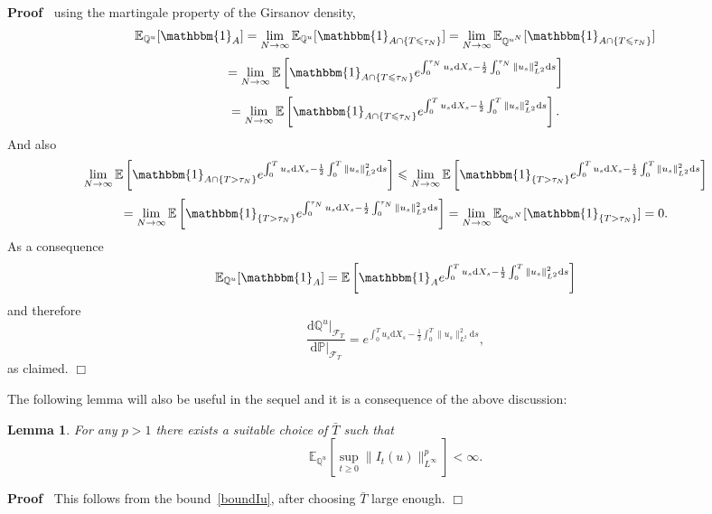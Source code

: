 \documentclass[11pt]{article}
\newcommand{\mathd}{\mathrm{d}}
\newenvironment{proof}{\noindent\textbf{Proof\ }}{\hspace*{\fill}$\Box$\medskip}
\newtheorem{lemma}{Lemma}
\newcommand{\CF}{\mathscr{F}}
\begin{document}
\begin{proof}
  using the martingale property of the Girsanov density,
  \[ \mathbb{E}_{\mathbb{Q}^u} [\mathbbm{1}_A] = \lim_{N \rightarrow \infty}
     \mathbb{E}_{\mathbb{Q}^u} [\mathbbm{1}_{A \cap \{ T \leqslant \tau_N \}}]
     = \lim_{N \rightarrow \infty} \mathbb{E}_{\mathbb{Q}^{u^N}}
     [\mathbbm{1}_{A \cap \{ T \leqslant \tau_N \}}] \]
  \[ = \lim_{N \rightarrow \infty} \mathbb{E} \left[ \mathbbm{1}_{A \cap \{ T
     \leqslant \tau_N \}} e^{\int^{\tau_N}_0 u_s \mathd X_s - \frac{1}{2}
     \int^{\tau_N}_0 \| u_s \|^2_{L^2} \mathd s} \right] \]
  \[ = \lim_{N \rightarrow \infty} \mathbb{E} \left[ \mathbbm{1}_{A \cap \{ T
     \leqslant \tau_N \}} e^{\int^T_0 u_s \mathd X_s - \frac{1}{2} \int^T_0 \|
     u_s \|^2_{L^2} \mathd s} \right] . \]
  And also
  \[ \lim_{N \rightarrow \infty} \mathbb{E} \left[ \mathbbm{1}_{A \cap \{ T >
     \tau_N \}} e^{\int^T_0 u_s \mathd X_s - \frac{1}{2} \int^T_0 \| u_s
     \|^2_{L^2} \mathd s} \right] \leqslant \lim_{N \rightarrow \infty}
     \mathbb{E} \left[ \mathbbm{1}_{\{ T > \tau_N \}} e^{\int^T_0 u_s \mathd
     X_s - \frac{1}{2} \int^T_0 \| u_s \|^2_{L^2} \mathd s} \right] \]
  \[ = \lim_{N \rightarrow \infty} \mathbb{E} \left[ \mathbbm{1}_{\{ T > \tau_N
     \}} e^{\int^{\tau_N}_0 u_s \mathd X_s - \frac{1}{2} \int^{\tau_N}_0 \|
     u_s \|^2_{L^2} \mathd s} \right] = \lim_{N \rightarrow \infty}
     \mathbb{E}_{\mathbb{Q}^{u^N}} [\mathbbm{1}_{\{ T > \tau_N \}}] = 0. \]
  As a consequence
  \[ \mathbb{E}_{\mathbb{Q}^u} [\mathbbm{1}_A] =\mathbb{E} \left[ \mathbbm{1}_A
     e^{\int^T_0 u_s \mathd X_s - \frac{1}{2} \int^T_0 \| u_s \|^2_{L^2}
     \mathd s} \right] \]
  and therefore
  \[ \frac{\mathd \mathbb{Q}^u |_{\CF_T}}{\mathd \mathbb{P}|_{\CF_T}} =
     e^{\int^T_0 u_s \mathd X_s - \frac{1}{2} \int^T_0 \| u_s \|^2_{L^2}
     \mathd s}, \]
  as claimed.
\end{proof}

The following lemma will also be useful in the sequel and it is a consequence
of the above discussion:

\begin{lemma}
  For any $p > 1$ there exists a suitable choice of $\bar{T}$ such that
  \[ \mathbb{E}_{\mathbb{Q}^u} [\sup_{t \geqslant 0} \| I_t (u)
     \|^p_{L^{\infty}}] < \infty . \]
\end{lemma}

\begin{proof}
  This follows from the bound~{\eqref{boundIu}}, after choosing $\bar{T}$
  large enough. 
\end{proof}
\end{document}
